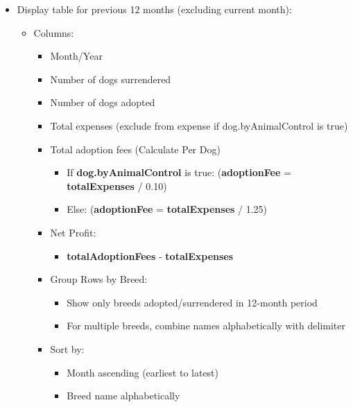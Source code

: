 \documentclass{article}
\begin{document}
\begin{itemize}
\item Display table for previous 12 months (excluding current month):
\begin{itemize}
    \item Columns:
    \begin{itemize}
        \item Month/Year
        \item Number of dogs surrendered
        \item Number of dogs adopted
        \item Total expenses (exclude from expense if dog.byAnimalControl is true)
        \item Total adoption fees (Calculate Per Dog)
        \begin{itemize}
            \item If \textbf{dog.byAnimalControl} is true: (\textbf{adoptionFee} = \textbf{totalExpenses} / 0.10)
            \item Else: (\textbf{adoptionFee} = \textbf{totalExpenses} / 1.25)
        \end{itemize}
        \item Net Profit:
        \begin{itemize}
            \item \textbf{totalAdoptionFees} - \textbf{totalExpenses}
        \end{itemize}
        \item Group Rows by Breed:
        \begin{itemize}
            \item Show only breeds adopted/surrendered in 12-month period
            \item For multiple breeds, combine names alphabetically with delimiter
        \end{itemize}
        \item Sort by:
        \begin{itemize}
            \item Month ascending (earliest to latest)
            \item Breed name alphabetically
        \end{itemize}
    \end{itemize}
\end{itemize}        
\end{itemize}    
\end{document}
